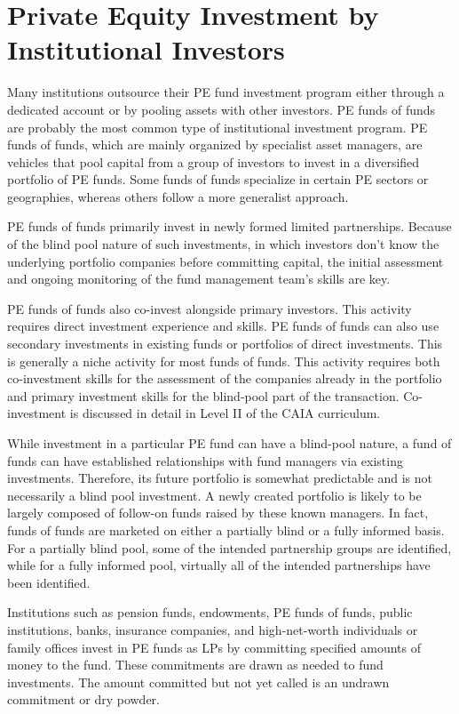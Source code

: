 \documentclass[11pt]{article}
\begin{document}
\section*{Private Equity Investment by Institutional Investors}
Many institutions outsource their PE fund investment program either through a dedicated account or by pooling assets with other investors. PE funds of funds are probably the most common type of institutional investment program. PE funds of funds, which are mainly organized by specialist asset managers, are vehicles that pool capital from a group of investors to invest in a diversified portfolio of PE funds. Some funds of funds specialize in certain PE sectors or geographies, whereas others follow a more generalist approach.

PE funds of funds primarily invest in newly formed limited partnerships. Because of the blind pool nature of such investments, in which investors don't know the underlying portfolio companies before committing capital, the initial assessment and ongoing monitoring of the fund management team's skills are key.

PE funds of funds also co-invest alongside primary investors. This activity requires direct investment experience and skills. PE funds of funds can also use secondary investments in existing funds or portfolios of direct investments. This is generally a niche activity for most funds of funds. This activity requires both co-investment skills for the assessment of the companies already in the portfolio and primary investment skills for the blind-pool part of the transaction. Co-investment is discussed in detail in Level II of the CAIA curriculum.

While investment in a particular PE fund can have a blind-pool nature, a fund of funds can have established relationships with fund managers via existing investments. Therefore, its future portfolio is somewhat predictable and is not necessarily a blind pool investment. A newly created portfolio is likely to be largely composed of follow-on funds raised by these known managers. In fact, funds of funds are marketed on either a partially blind or a fully informed basis. For a partially blind pool, some of the intended partnership groups are identified, while for a fully informed pool, virtually all of the intended partnerships have been identified.

Institutions such as pension funds, endowments, PE funds of funds, public institutions, banks, insurance companies, and high-net-worth individuals or family offices invest in PE funds as LPs by committing specified amounts of money to the fund. These commitments are drawn as needed to fund investments. The amount committed but not yet called is an undrawn commitment or dry powder.
\end{document}
